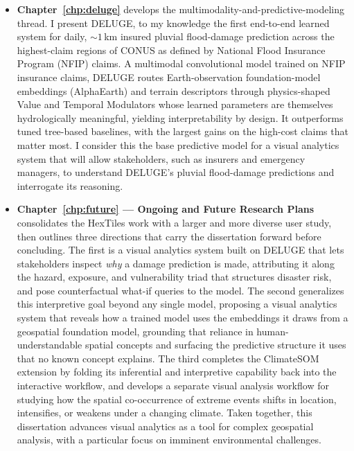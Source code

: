 \begin{itemize}[topsep=2pt, leftmargin=*]
    \item \textbf{Chapter~\ref{chp:deluge}} develops the multimodality-and-predictive-modeling thread. I present DELUGE, to my knowledge the first end-to-end learned system for daily, ${\sim}1$\,km insured pluvial flood-damage prediction across the highest-claim regions of CONUS as defined by National Flood Insurance Program (NFIP) claims. A multimodal convolutional model trained on NFIP insurance claims, DELUGE routes Earth-observation foundation-model embeddings (AlphaEarth) and terrain descriptors through physics-shaped Value and Temporal Modulators
        whose learned parameters are themselves hydrologically meaningful, yielding interpretability by design. It outperforms tuned tree-based baselines, with the largest gains on the high-cost claims that matter most. I consider this the base predictive model for a visual analytics system that will allow stakeholders, such as insurers and emergency managers, to understand DELUGE's pluvial flood-damage predictions and interrogate its reasoning.
    \item \textbf{Chapter~\ref{chp:future} --- Ongoing and Future Research Plans} consolidates the HexTiles work with a larger and more diverse user study, then outlines three directions that carry the dissertation forward before concluding. The first is a visual analytics system built on DELUGE that lets stakeholders inspect \emph{why} a damage prediction is made, attributing it along the hazard, exposure, and vulnerability triad that structures disaster risk, and pose counterfactual what-if queries to the model. The second generalizes this interpretive goal beyond any single model, proposing a visual analytics system that reveals how a trained model uses the embeddings it draws from a geospatial foundation model, grounding that reliance in human-understandable spatial concepts and surfacing the predictive structure it uses that no known concept explains. The third completes the ClimateSOM extension by folding its inferential and interpretive capability back into the interactive workflow, and develops a separate visual analysis workflow for studying how the spatial co-occurrence of extreme events shifts in location, intensifies, or weakens under a changing climate. Taken together, this dissertation advances visual analytics as a tool for complex geospatial analysis, with a particular focus on imminent environmental challenges.
\end{itemize}

